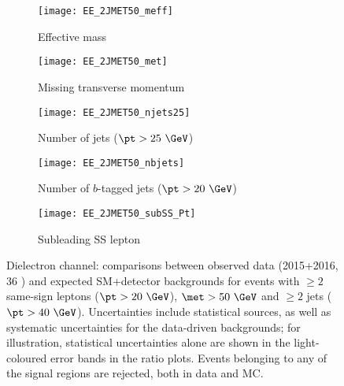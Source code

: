 
\begin{figure}[t!]
\centering
\begin{subfigure}[t]{0.48\textwidth}
\texttt{[image: EE\_2JMET50\_meff]}
\caption{Effective mass \meff}
\end{subfigure}
\begin{subfigure}[t]{0.48\textwidth}
\texttt{[image: EE\_2JMET50\_met]}
\caption{Missing transverse momentum \met}
\end{subfigure}
\begin{subfigure}[t]{0.48\textwidth}
\texttt{[image: EE\_2JMET50\_njets25]}
\caption{Number of jets ($\pt>25~\GeV$)}
\end{subfigure}
\begin{subfigure}[t]{0.48\textwidth}
\texttt{[image: EE\_2JMET50\_nbjets]}
\caption{Number of $b$-tagged jets ($\pt>20~\GeV$)}
\end{subfigure}
\begin{subfigure}[t]{0.48\textwidth}
\texttt{[image: EE\_2JMET50\_subSS\_Pt]}
\caption{Subleading SS lepton \pt}
\end{subfigure}
\caption{Dielectron channel: comparisons between observed data (2015+2016, 36 \ifb) and expected SM+detector backgrounds 
for events with $\ge 2$ same-sign leptons ($\pt>20~\GeV$), $\met>50~\GeV$ and $\ge 2$ jets ($\pt>40~\GeV$). 
Uncertainties include statistical sources, as well as systematic uncertainties for the data-driven backgrounds; 
for illustration, statistical uncertainties alone are shown in the light-coloured error bands in the ratio plots. 
Events belonging to any of the signal regions are rejected, both in data and MC. 
}
\label{fig:distributions_channelEE_2015}
\end{figure} 

